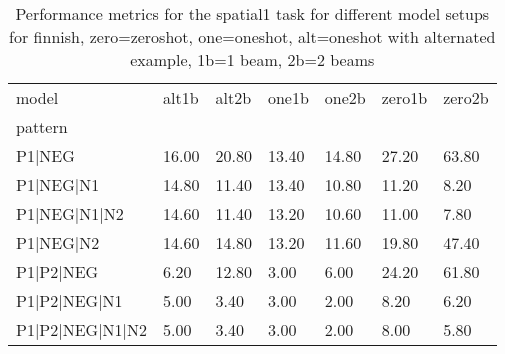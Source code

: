 \begin{table}[h]
\begin{tabular}{l|llllll}
\toprule
model & alt1b & alt2b & one1b & one2b & zero1b & zero2b \\
pattern &  &  &  &  &  &  \\
\midrule
P1|NEG & 16.00 & 20.80 & 13.40 & 14.80 & 27.20 & 63.80 \\
P1|NEG|N1 & 14.80 & 11.40 & 13.40 & 10.80 & 11.20 & 8.20 \\
P1|NEG|N1|N2 & 14.60 & 11.40 & 13.20 & 10.60 & 11.00 & 7.80 \\
P1|NEG|N2 & 14.60 & 14.80 & 13.20 & 11.60 & 19.80 & 47.40 \\
P1|P2|NEG & 6.20 & 12.80 & 3.00 & 6.00 & 24.20 & 61.80 \\
P1|P2|NEG|N1 & 5.00 & 3.40 & 3.00 & 2.00 & 8.20 & 6.20 \\
P1|P2|NEG|N1|N2 & 5.00 & 3.40 & 3.00 & 2.00 & 8.00 & 5.80 \\
\bottomrule
\end{tabular}
\caption{Performance metrics for the spatial1 task for different model setups for finnish, zero=zeroshot, one=oneshot, alt=oneshot with alternated example, 1b=1 beam, 2b=2 beams}
\label{tab:fi_spatial1_performance}
\end{table}
